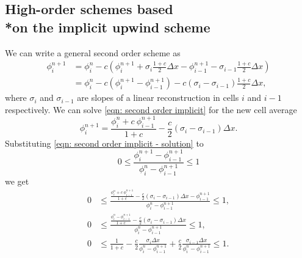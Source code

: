 \documentclass[../thesis.tex]{subfiles}
\begin{document}
\subsection[]{High-order schemes based \\*on the implicit upwind scheme}
We can write a general second order scheme as
\begin{equation}\label{eqn: second order implicit}
    \begin{split}
        \phi_{i}^{n+1}
        &= \phi_{i}^{n} - c\left(
            \phi_{i}^{n+1}
            + \sigma_{i}\frac{1+c}{2}\Delta x - \phi_{i-1}^{n+1}
            -\sigma_{i-1}\frac{1+c}{2}\Delta x \right)
        \\
        &= \phi_{i}^{n} - c\left(
            \phi_{i}^{n+1}
            - \phi_{i-1}^{n+1}
            \right)
            -c\left(
            \sigma_{i} - \sigma_{i-1}
            \right)\frac{1+c}{2}\Delta x,
    \end{split}
\end{equation}
where \(\sigma_{i}\) and \(\sigma_{i-1}\) are slopes of a linear reconstruction in cells \(i\) and \(i-1\) respectively. We can solve \eqref{eqn: second order implicit} for the
new cell average
\begin{equation}\label{eqn: second order implicit - solution}
    \phi_{i}^{n+1} =
    \frac{\phi_{i}^{n} +
    c~\phi_{i-1}^{n+1}}{1+c}
    -\frac{c}{2}\left(
        \sigma_{i} - \sigma_{i-1}
        \right)\Delta x.
\end{equation}
Substituting \eqref{eqn: second order implicit - solution} to
\[
    0
    \leq
    \frac{\phi_{i}^{n+1} - \phi_{i-1}^{n+1}}
    {\phi_{i}^{n} - \phi_{i-1}^{n+1}}
    \leq
    1
\]we get
\begin{equation}
    \begin{split}
        0
        &\leq
        \frac{
        \frac{\phi_{i}^{n} +
        c~\phi_{i-1}^{n+1}}{1+c}
        -\frac{c}{2}\left(
            \sigma_{i} - \sigma_{i-1}
            \right)\Delta x - \phi_{i-1}^{n+1}}{\phi_{i}^{n} - \phi_{i-1}^{n+1}}
        \leq
        1,
        \\
        0
        &\leq
        \frac{
        \frac{\phi_{i}^{n} - \phi_{i-1}^{n+1}}{1+c}
        -\frac{c}{2}\left(
            \sigma_{i} - \sigma_{i-1}
            \right)\Delta x}{\phi_{i}^{n} - \phi_{i-1}^{n+1}}
        \leq
        1,
        \\
        0
        &\leq
        \frac{1}{1+c}
        -\frac{c}{2}
        \frac{\sigma_{i}\Delta x}
        {\phi_{i}^{n} - \phi_{i-1}^{n+1}}
        +\frac{c}{2}
        \frac{\sigma_{i-1}\Delta x}
        {\phi_{i}^{n} - \phi_{i-1}^{n+1}}
        \leq
        1.
    \end{split}
\end{equation}
\end{document}
